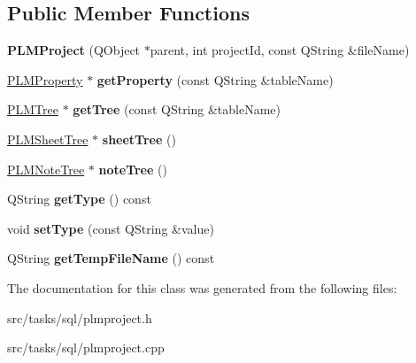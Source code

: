 \subsection*{Public Member Functions}
\begin{DoxyCompactItemize}
\item 
{\bfseries P\+L\+M\+Project} (Q\+Object $\ast$parent, int project\+Id, const Q\+String \&file\+Name)\hypertarget{class_p_l_m_project_aea4d4bc12ab91752c2e5bab017f0ac82}{}\label{class_p_l_m_project_aea4d4bc12ab91752c2e5bab017f0ac82}

\item 
\hyperlink{class_p_l_m_property}{P\+L\+M\+Property} $\ast$ {\bfseries get\+Property} (const Q\+String \&table\+Name)\hypertarget{class_p_l_m_project_a0a55163d106463983a9d6cc4211f0a76}{}\label{class_p_l_m_project_a0a55163d106463983a9d6cc4211f0a76}

\item 
\hyperlink{class_p_l_m_tree}{P\+L\+M\+Tree} $\ast$ {\bfseries get\+Tree} (const Q\+String \&table\+Name)\hypertarget{class_p_l_m_project_a1a8c835fccc0c815635bd15bbde5b593}{}\label{class_p_l_m_project_a1a8c835fccc0c815635bd15bbde5b593}

\item 
\hyperlink{class_p_l_m_sheet_tree}{P\+L\+M\+Sheet\+Tree} $\ast$ {\bfseries sheet\+Tree} ()\hypertarget{class_p_l_m_project_ae8154e108519c03653e931db60c5aa85}{}\label{class_p_l_m_project_ae8154e108519c03653e931db60c5aa85}

\item 
\hyperlink{class_p_l_m_note_tree}{P\+L\+M\+Note\+Tree} $\ast$ {\bfseries note\+Tree} ()\hypertarget{class_p_l_m_project_a556db2493d0941ca4b942d9d4d5a3706}{}\label{class_p_l_m_project_a556db2493d0941ca4b942d9d4d5a3706}

\item 
Q\+String {\bfseries get\+Type} () const \hypertarget{class_p_l_m_project_a46a7edd0080785ffd078b607f007b17a}{}\label{class_p_l_m_project_a46a7edd0080785ffd078b607f007b17a}

\item 
void {\bfseries set\+Type} (const Q\+String \&value)\hypertarget{class_p_l_m_project_a682098f2b06e28d0eef4a6d1b002385b}{}\label{class_p_l_m_project_a682098f2b06e28d0eef4a6d1b002385b}

\item 
Q\+String {\bfseries get\+Temp\+File\+Name} () const \hypertarget{class_p_l_m_project_aba1306178d23255800a9e52709dbfd13}{}\label{class_p_l_m_project_aba1306178d23255800a9e52709dbfd13}

\end{DoxyCompactItemize}


The documentation for this class was generated from the following files\+:\begin{DoxyCompactItemize}
\item 
src/tasks/sql/plmproject.\+h\item 
src/tasks/sql/plmproject.\+cpp\end{DoxyCompactItemize}
